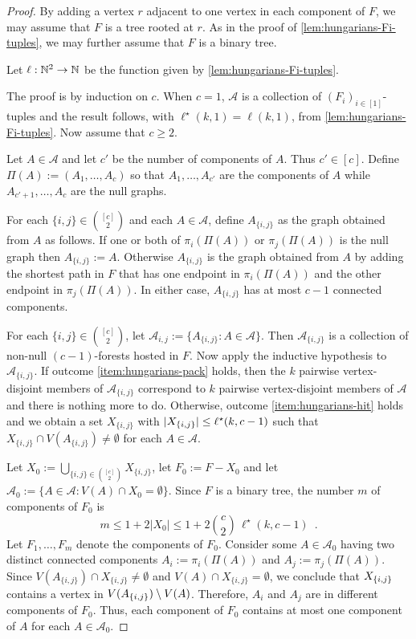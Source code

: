 \documentclass{patmorin}
\newcommand{\pat}[1]{\textcolor{Blue}{[Pat: #1]}}
\newcommand{\piotr}[1]{\textcolor{red}{Piotr: #1}}
\DeclarePairedDelimiter\set{\{}{\}}
\renewcommand{\mid}{:}  %
\begin{document}
\hungarians*
\begin{proof}
  By adding a vertex $r$ adjacent to one vertex in each component of $F$, we may assume that $F$ is a tree rooted at $r$.  As in the proof of \cref{lem:hungarians-Fi-tuples}, we may further assume that $F$ is a binary tree.

  Let $\ell:\mathbb{N}^2\to\mathbb{N}$ be the function given by \cref{lem:hungarians-Fi-tuples}.

  The proof is by induction on $c$.  When $c=1$, $\mathcal{A}$ is a collection of $(F_i)_{i\in[1]}$-tuples and the result follows, with $\ell^\star(k,1)=\ell(k,1)$, from \cref{lem:hungarians-Fi-tuples}.  Now assume that $c\ge 2$.

  Let $A\in\mathcal{A}$ and let $c'$ be the number of components of $A$. Thus $c'\in[c]$.
  Define $\Pi(A):=(A_1,\ldots,A_c)$ so that $A_1,\ldots,A_{c'}$ are the components of $A$ while $A_{c'+1},\ldots,A_c$ are the null graphs.

  For each $\{i,j\}\in\binom{[c]}{2}$ and each $A\in\mathcal{A}$, define $A_{\{i,j\}}$ as the graph obtained from $A$ as follows.  If one or both of $\pi_i(\Pi(A))$ or $\pi_j(\Pi(A))$ is the null graph then $A_{\{i,j\}}:=A$. Otherwise $A_{\{i,j\}}$ is the graph obtained from $A$ by adding the shortest path in $F$ that has one endpoint in $\pi_i(\Pi(A))$ and the other endpoint in $\pi_j(\Pi(A))$.  In either case, $A_{\{i,j\}}$ has at most $c-1$ connected components.

  For each $\{i,j\}\in\binom{[c]}{2}$, let $\mathcal{A}_{i,j}:=\{A_{\{i,j\}}\mid A\in \mathcal{A}\}$.  Then $\mathcal{A}_{\{i,j\}}$ is a collection of non-null $(c-1)$-forests hosted in $F$.  Now apply the inductive hypothesis to $\mathcal{A}_{\{i,j\}}$.  If outcome \cref{item:hungarians-pack} holds, then the $k$ pairwise vertex-disjoint members of $\mathcal{A}_{\{i,j\}}$ correspond to $k$ pairwise vertex-disjoint members of $\mathcal{A}$ and there is nothing more to do. Otherwise, outcome \cref{item:hungarians-hit} holds and we obtain a set $X_{\{i,j\}}$ with $|X_{\set{i,j}}|\leq \ell^\star(k,c-1)$ such that $X_{\{i,j\}}\cap V(A_{\{i,j\}})\neq\emptyset$ for each $A\in\mathcal{A}$.


  Let $X_0:=\bigcup_{\{i,j\}\in\binom{[c]}{2}} X_{\{i,j\}}$, let $F_0:=F-X_0$ and let $\mathcal{A}_0:=\{A\in\mathcal{A}\mid V(A)\cap X_0=\emptyset\}$.  Since $F$ is a binary tree, the number $m$ of components of $F_0$ is
  \begin{equation}
    \textstyle m \leq 1+2|X_0|\le 1+2\binom{c}{2}\,\ell^\star(k,c-1) \enspace .
  \end{equation}
  Let $F_1,\ldots,F_m$ denote the components of $F_0$.
  Consider some $A\in\mathcal{A}_0$ having two distinct connected components $A_i:=\pi_i(\Pi(A))$ and $A_j:=\pi_j(\Pi(A))$.  Since $V(A_{\{i,j\}})\cap X_{\{i,j\}}\neq\emptyset$ and $V(A)\cap X_{\{i,j\}}=\emptyset$,
  we conclude that $X_{\set{i,j}}$ contains a vertex in $V(A_{\set{i,j}})\setminus V(A)$.
  Therefore, $A_i$ and $A_j$ are in different components of $F_0$.  Thus, each component of $F_0$ contains at most one component of $A$ for each $A\in\mathcal{A}_0$.


\end{proof}
\end{document}
